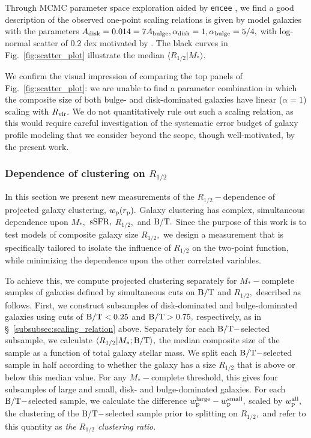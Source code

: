 \documentclass[usenatbib,usegraphicx,letterpaper]{mn2e}
\newcommand{\rhalf}{R_{1/2}}
\newcommand{\adisk}{A_{\rm disk}}
\newcommand{\abulge}{A_{\rm bulge}}
\newcommand{\alphadisk}{\alpha_{\rm disk}}
\newcommand{\alphabulge}{\alpha_{\rm bulge}}
\newcommand{\rvir}{R_{\rm vir}}
\newcommand{\bt}{{\rm B/T}}
\newcommand{\mstar}{M_{\ast}}
\newcommand{\ssfr}{{\rm sSFR}}
\newcommand{\rproj}{r_{\rm p}}
\newcommand{\wproj}{w_{\rm p}}
\begin{document}
Through MCMC parameter space exploration aided by {\tt emcee} \citep{emcee_hammer}, we find a good description of the observed one-point scaling relations is given by model galaxies with the parameters $\adisk=0.014=7\abulge, \alphadisk=1, \alphabulge=5/4,$ with log-normal scatter of $0.2$ dex motivated by \citet{somerville_etal17}. The black curves in Fig.~\ref{fig:scatter_plot} illustrate the median $\langle\rhalf\vert\mstar\rangle.$

We confirm the visual impression of comparing the top panels of Fig.~\ref{fig:scatter_plot}: we are unable to find a parameter combination in which the composite size of both bulge- and disk-dominated galaxies have linear ($\alpha=1$) scaling with $\rvir.$ We do not quantitatively rule out such a scaling relation, as this would require careful investigation of the systematic error budget of galaxy profile modeling that we consider beyond the scope, though well-motivated, by the present work.

\subsubsection{Dependence of clustering on $\rhalf$}
\label{subsubsec:clustering_tests}

In this section we present new measurements of the $\rhalf-$dependence of projected galaxy clustering, $\wproj(\rproj).$ Galaxy clustering has complex, simultaneous dependence upon $\mstar,$ $\ssfr,$ $\rhalf,$ and $\bt.$ Since the purpose of this work is to test models of composite galaxy size $\rhalf,$ we design a measurement that is specifically tailored to isolate the influence of $\rhalf$ on the two-point function, while minimizing the dependence upon the other correlated variables.

To achieve this, we compute projected clustering separately for $\mstar-$complete samples of galaxies defined by simultaneous cuts on $\bt$ and $\rhalf,$ described as follows. First, we construct subsamples of disk-dominated and bulge-dominated galaxies using cuts of $\bt<0.25$ and $\bt>0.75,$ respectively, as in \S~\ref{subsubsec:scaling_relation} above. Separately for each $\bt-$selected subsample, we calculate $\langle\rhalf\vert\mstar;\bt\rangle,$ the median composite size of the sample as a function of total galaxy stellar mass. We split each $\bt-$selected sample in half according to whether the galaxy has a size $\rhalf$ that is above or below this median value. For any $\mstar-$complete threshold, this gives four subsamples of large and small, disk- and bulge-dominated galaxies. For each $\bt-$selected sample, we calculate the difference $\wproj^{\rm large}-\wproj^{\rm small},$ scaled by $\wproj^{\rm all},$ the clustering of the $\bt-$selected sample prior to splitting on $\rhalf,$ and refer to this quantity as {\em the $\rhalf$ clustering ratio}.
\end{document}
